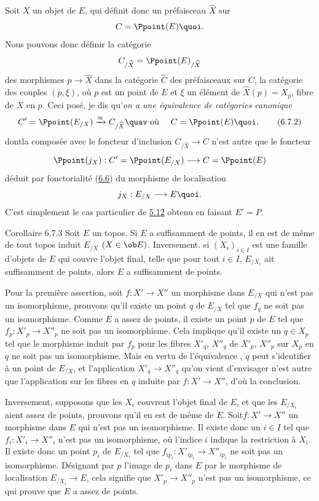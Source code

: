 \documentclass[10pt]{../fichiers-configuration-latex/smfart}
\begin{document}
Soit $X$ un objet de $E$, qui définit donc un préfaisceau
$\widehat{X}$ sur
$$
C=\Ppoint(E){\quoi}.
$$
Nous pouvons donc définir la catégorie
$$
C_{/\widehat{X}}=\Ppoint(E)_{/\widehat{X}}
$$
des morphismes $p\rightarrow \widehat{X}$ dans la catégorie
$\widehat{C}$ des préfaisceaux sur $C$, \ie la catégorie des couples
$(p,\xi)$, où $p$ est un point de $E$ et $\xi$ un élément de
$\widehat{X}(p)=X_p$, fibre de $X$ en $p$. Ceci posé, je dis
qu'\emph{on a une équivalence de catégories canonique}
\begin{equation*}
C'=\Ppoint(E_{/X})\xrightarrow{\approx}C_{/\widehat{X}}\quav \mbox{
où }\quad C=\Ppoint(E){\quoi},\tag{6.7.2}
\end{equation*}
dont\pageoriginale la composée avec le foncteur d'inclusion
$C_{/\widehat{X}}\rightarrow C$ n'est autre que le foncteur
$$
\Ppoint(j_X):C'=\Ppoint(E_{/X})\longrightarrow C=\Ppoint(E)
$$
déduit par fonctorialité (\hyperref[IV.subsec6.6]{6.6}) du morphisme de
localisation 
$$
j_X:E_{/X}\longrightarrow E{\quoi}.
$$
C'est simplement le cas particulier de \hyperref[IV.prop5.12]{5.12} obtenu en
faisant $E'=P$.

\begin{enonce*}{Corollaire 6.7.3}
Soit $E$ un topos. Si $E$ a suffisamment de points, il en est de
même de tout topos induit $E_{/X}$ $(X\in \ob E)$. Inversement. si
$(X_i)_{i\in I}$ est une famille d'objets de $E$ qui couvre l'objet
final, telle que pour tout $i\in I$, $E_{/X_i}$ ait suffisamment de
points, alors $E$ a suffisamment de points.
\end{enonce*}

Pour la première assertion, soit $f:X'\rightarrow X''$ un morphisme
dans $E_{/X}$ qui n'est pas un isomorphisme, prouvons qu'il existe
un point $q$ de $E_{/X}$ tel que $f_q$ ne soit pas un isomorphisme.
Comme $E$ a assez de points, il existe un point $p$ de $E$ tel que
$f_p:X'_p\rightarrow X''_p$ ne soit pas un isomorphisme. Cela
implique qu'il existe un $q\in X_p$ tel que le morphisme induit par
$f_p$ pour les fibres $X'_q$, $X''_q$ de $X'_p$, $X''_p$ sur $X_p$
en $q$ ne soit pas un isomorphisme. Mais en vertu de l'équivalence
, $q$ peut s'identifier à un point de $E_{/X}$, et
l'application $X'_q\rightarrow X''_q$ qu'on vient d'envisager n'est
autre que l'application sur les fibres en $q$ induite par
$f:X'\rightarrow X''$, d'où la conclusion.

Inversement, supposons que les $X_i$ couvrent l'objet final de $E$,
et que les $E_{/X_i}$ aient assez de points, prouvons qu'il en est
de même de $E$. Soit\pageoriginale $f:X'\rightarrow X''$ un
morphisme dans $E$ qui n'est pas un isomorphisme. Il existe donc un
$i\in I$ tel que $f_i:X'_i\rightarrow X''_i$ n'est pas un
isomorphisme, où l'indice $i$ indique la restriction à $X_i$. Il
existe donc un point $p_i$ de $E_{/X_i}$ tel que
$f_{ip_i}:X'_{ip_i}\rightarrow X''_{ip_i}$ ne soit pas un
isomorphisme. Désignant par $p$ l'image de $p_i$ dans $E$ par le
morphisme de localisation $E_{/X_i}\rightarrow E$, cela signifie que
$X'_p\rightarrow X''_p$ n'est pas un isomorphisme, ce qui prouve que
$E$ a assez de points.
\end{document}
